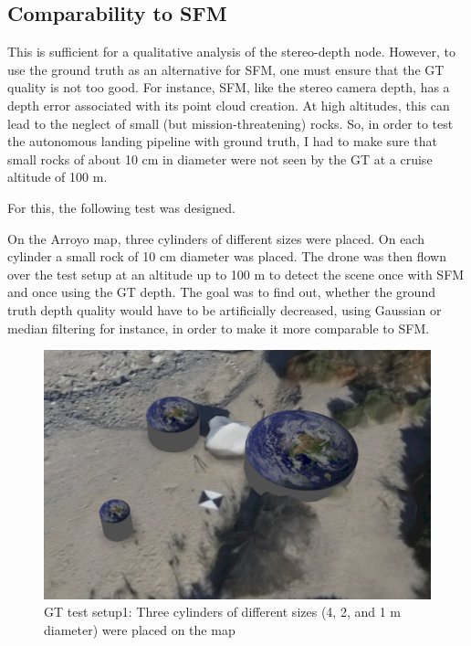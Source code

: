 \subsection{Comparability to SFM}

This is sufficient for a qualitative analysis of the stereo-depth node. However, to use the ground truth as an alternative for SFM, one must ensure that the GT quality is not too good. For instance, SFM, like the stereo camera depth, has a depth error associated with its point cloud creation. At high altitudes, this can lead to the neglect of small (but mission-threatening) rocks. So, in order to test the autonomous landing pipeline with ground truth, I had to make sure that small rocks of about 10 cm in diameter were not seen by the GT at a cruise altitude of 100 m.

For this, the following test was designed.

On the Arroyo map, three cylinders of different sizes were placed. On each cylinder a small rock of 10 cm diameter was placed. The drone was then flown over the test setup at an altitude up to 100 m to detect the scene once with SFM and once using the GT depth. The goal was to find out, whether the ground truth depth quality would have to be artificially decreased, using Gaussian or median filtering for instance, in order to make it more comparable to SFM.

\begin{figure}[ht]
\centering
\includegraphics[scale=0.3]{images/methodology/test_setup1.png}
\caption{GT test setup1: Three cylinders of different sizes (4, 2, and 1 m diameter) were placed on the map}
\label{fig:gt_test_setup1}
\end{figure}

